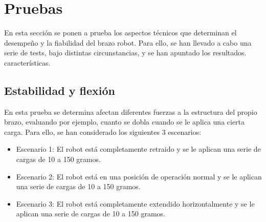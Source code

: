 \newpage
\section{Pruebas}
\noindent En esta sección se ponen a prueba los aspectos técnicos que determinan el desempeño y la fiabilidad del brazo robot. Para ello, 
se han llevado a cabo una serie de tests, bajo distintas circunstancias, y se han apuntado los resultados.
características.

\subsection{Estabilidad y flexión}
\noindent En esta prueba se determina afectan diferentes fuerzas a la estructura del propio brazo, evaluando por ejemplo, cuanto se dobla 
cuando se le aplica una cierta carga.
Para ello, se han considerado los siguientes 3 escenarios:
\begin{itemize}
    \item Escenario 1: El robot está completamente retraido y se le aplican una serie de cargas de 10 a 150 gramos.
    \item Escenario 2: El robot está en una posición de operación normal y se le aplican una serie de cargas de 10 a 150 gramos.
    \item Escenario 3: El robot está completamente extendido horizontalmente y se le aplican una serie de cargas de 10 a 150 gramos.
\end{itemize}

